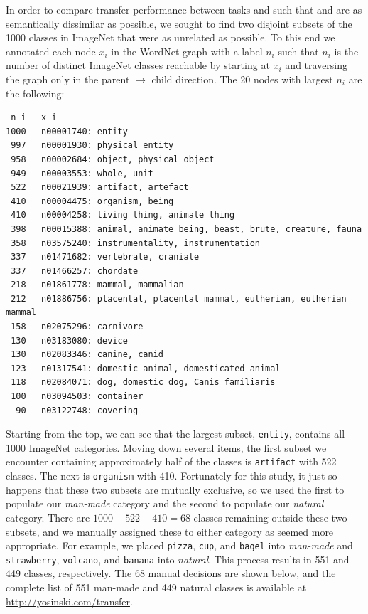 In order to compare transfer performance between tasks \dA and \dB
such that \dA and \dB are as semantically dissimilar as possible, we
sought to find two disjoint subsets of the 1000 classes in ImageNet
that were as unrelated as possible. To this end we annotated each node
$x_i$ in the WordNet graph with a label $n_i$ such that $n_i$ is the
number of distinct ImageNet classes reachable by starting at $x_i$ and traversing the graph only in the parent
$\rightarrow$ child direction.
The 20 nodes with largest $n_i$ are the following:

{
\small
\begin{verbatim}
 n_i   x_i
1000   n00001740: entity
 997   n00001930: physical entity
 958   n00002684: object, physical object
 949   n00003553: whole, unit
 522   n00021939: artifact, artefact
 410   n00004475: organism, being
 410   n00004258: living thing, animate thing
 398   n00015388: animal, animate being, beast, brute, creature, fauna
 358   n03575240: instrumentality, instrumentation
 337   n01471682: vertebrate, craniate
 337   n01466257: chordate
 218   n01861778: mammal, mammalian
 212   n01886756: placental, placental mammal, eutherian, eutherian mammal
 158   n02075296: carnivore
 130   n03183080: device
 130   n02083346: canine, canid
 123   n01317541: domestic animal, domesticated animal
 118   n02084071: dog, domestic dog, Canis familiaris
 100   n03094503: container
  90   n03122748: covering
\end{verbatim}
}

Starting from the top, we can see that the largest subset, \texttt{entity}, contains all
1000 ImageNet categories. Moving down several items, the first
subset we encounter containing approximately half of the classes
is \texttt{artifact} with 522 classes. The next is \texttt{organism}
with 410. Fortunately for this study, it just so happens that these two subsets are mutually
exclusive, so we used the first to populate our \textit{man-made} category and the second to populate our \textit{natural} category.
 There are
$1000 - 522 - 410 = 68$ classes remaining outside these two subsets, and we manually assigned these to either category as seemed more appropriate.
For example, we placed
\texttt{pizza}, 
\texttt{cup}, and
\texttt{bagel} into \textit{man-made} and 
\texttt{strawberry}, 
\texttt{volcano}, and 
\texttt{banana} into \textit{natural}. This process results in 551 and 449 classes, respectively. The 68 manual decisions are shown below, and the complete list of 551 man-made and 449 natural classes is available at \url{http://yosinski.com/transfer}.


